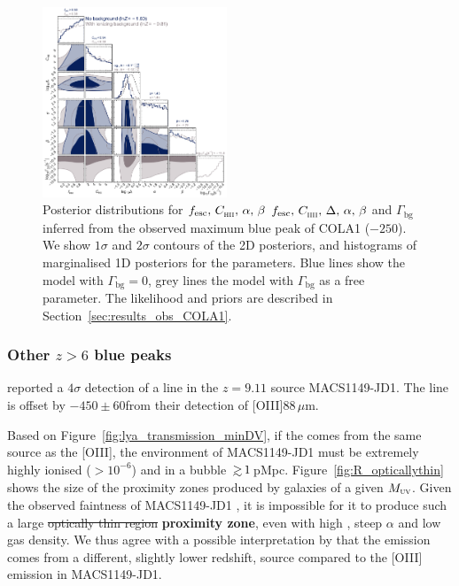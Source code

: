\documentclass[fleqn,usenatbib]{mnras}
\providecommand{\DIFadd}[1]{{\protect\color{Green} {\bf #1}}} %
\providecommand{\DIFdel}[1]{{\protect\color{Gray} \scriptsize \sout{#1}}} %
\providecommand{\DIFaddbegin}{} %
\providecommand{\DIFaddend}{} %
\providecommand{\DIFdelbegin}{} %
\providecommand{\DIFdelend}{} %
\providecommand{\DIFaddFL}[1]{\DIFadd{#1}} %
\providecommand{\DIFdelFL}[1]{\DIFdel{#1}} %
\providecommand{\DIFaddbeginFL}{} %
\providecommand{\DIFaddendFL}{} %
\providecommand{\DIFdelbeginFL}{} %
\providecommand{\DIFdelendFL}{} %
\newcommand{\DIFscaledelfig}{0.5}
\newlength{\DIFdelgraphicswidth} %
\newlength{\DIFdelgraphicsheight} %
\newcommand{\DIFaddincludegraphics}[2][]{{\color{purple}\fbox{\DIFOincludegraphics[#1]{#2}}}} %
\newcommand{\DIFdelincludegraphics}[2][]{%
\sbox{\DIFdelgraphicsbox}{\DIFOincludegraphics[#1]{#2}}%
\settoboxwidth{\DIFdelgraphicswidth}{\DIFdelgraphicsbox} %
\settoboxtotalheight{\DIFdelgraphicsheight}{\DIFdelgraphicsbox} %
\scalebox{\DIFscaledelfig}{%
\parbox[b]{\DIFdelgraphicswidth}{\usebox{\DIFdelgraphicsbox}\\[-\baselineskip] \rule{\DIFdelgraphicswidth}{0em}}\llap{\resizebox{\DIFdelgraphicswidth}{\DIFdelgraphicsheight}{%
\setlength{\unitlength}{\DIFdelgraphicswidth}%
\begin{picture}(1,1)%
\thicklines\linethickness{2pt} %
{\color[rgb]{1,0,0}\put(0,0){\framebox(1,1){}}}%
{\color[rgb]{1,0,0}\put(0,0){\line( 1,1){1}}}%
{\color[rgb]{1,0,0}\put(0,1){\line(1,-1){1}}}%
\end{picture}%
}\hspace*{3pt}}} %
} %
\DeclareRobustCommand{\DIFaddbegin}{\DIFOaddbegin \let\includegraphics\DIFaddincludegraphics} %
\DeclareRobustCommand{\DIFaddend}{\DIFOaddend \let\includegraphics\DIFOincludegraphics} %
\DeclareRobustCommand{\DIFdelbegin}{\DIFOdelbegin \let\includegraphics\DIFdelincludegraphics} %
\DeclareRobustCommand{\DIFdelend}{\DIFOaddend \let\includegraphics\DIFOincludegraphics} %
\DeclareRobustCommand{\DIFaddbeginFL}{\DIFOaddbeginFL \let\includegraphics\DIFaddincludegraphics} %
\DeclareRobustCommand{\DIFaddendFL}{\DIFOaddendFL \let\includegraphics\DIFOincludegraphics} %
\DeclareRobustCommand{\DIFdelbeginFL}{\DIFOdelbeginFL \let\includegraphics\DIFdelincludegraphics} %
\DeclareRobustCommand{\DIFdelendFL}{\DIFOaddendFL \let\includegraphics\DIFOincludegraphics} %
\begin{document}
\begin{figure}
    \includegraphics[width=0.49\textwidth]{figs/fig7.pdf}
    \caption{Posterior distributions for \DIFdelbeginFL \DIFdelFL{$\fesc, \, \clump, \, \alpha, \, \beta$ }\DIFdelendFL \DIFaddbeginFL \DIFaddFL{$\fesc, \, \clump, \, \Delta, \, \alpha, \, \beta$ }\DIFaddendFL and $\Gamma_\textrm{bg}$ inferred from the observed maximum blue \lya peak of COLA1 ($-250$\kms). We show $1\sigma$ and $2\sigma$ contours of the 2D posteriors, and histograms of marginalised 1D posteriors for the parameters. Blue lines show the model with $\Gamma_\mathrm{bg}=0$, grey lines the model with $\Gamma_\mathrm{bg}$ as a free parameter. The likelihood and priors are described in Section~\ref{sec:results_obs_COLA1}.}
    \label{fig:COLA1}
\end{figure}

\subsubsection{Other $z>6$ blue peaks}
\label{sec:results_obs_other}

\citet{Hashimoto2018a} reported a $4\sigma$ detection of a \lya line in the $z=9.11$ source MACS1149-JD1. The \lya line is offset by $-450\pm60$\kms from their detection of [OIII]88\,$\mu$m. 

Based on Figure~\ref{fig:lya_transmission_minDV}, if the \lya comes from the same source as the [OIII], the environment of MACS1149-JD1 must be extremely highly ionised ($>10^{-6}$) and in a bubble $\simgt1$\,pMpc. Figure~\ref{fig:R_opticallythin} shows the size of the proximity zones produced by galaxies of a given $\MUV$. Given the observed faintness of MACS1149-JD1 \citep[$\MUV = 18.5\pm0.1$ based on lens modelling and fits to photometry and grism spectroscopy,][]{Hoag2018a}, it is impossible for it to produce such a large \DIFdelbegin \DIFdel{optically thin region}\DIFdelend \DIFaddbegin \DIFadd{proximity zone}\DIFaddend , even with high \fesc, steep $\alpha$ and low gas density. We thus agree with a possible interpretation by \citet{Hashimoto2018a} that the \lya emission comes from a different, slightly lower redshift, source compared to the [OIII] emission in MACS1149-JD1.
\end{document}
